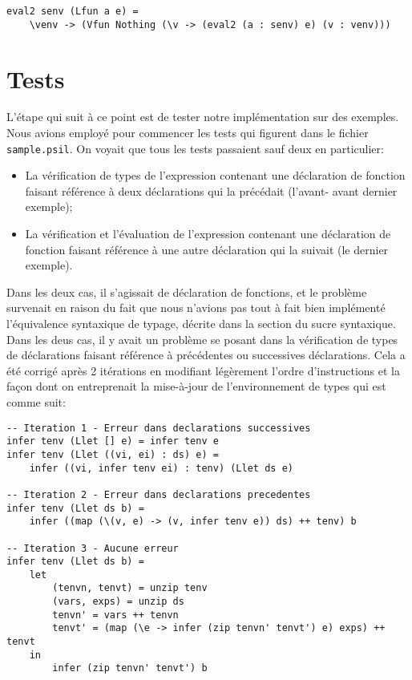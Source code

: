 \documentclass[11pt, titlepage]{article}
\begin{document}
\begin{lstlisting}
eval2 senv (Lfun a e) =
    \venv -> (Vfun Nothing (\v -> (eval2 (a : senv) e) (v : venv)))
\end{lstlisting}

\section{Tests}

L'étape qui suit à ce point est de tester notre implémentation sur des
exemples. Nous avions employé pour commencer les tests qui figurent dans le
fichier \texttt{sample.psil}. On voyait que tous les tests passaient sauf deux
en particulier:
\begin{itemize}
    \item La vérification de types de l'expression contenant une déclaration de
    fonction faisant référence à deux déclarations qui la précédait (l'avant-
    avant dernier exemple);
    \item La vérification et l'évaluation de l'expression contenant une
    déclaration de fonction faisant référence à une autre déclaration qui la
    suivait (le dernier exemple).
\end{itemize}

Dans les deux cas, il s'agissait de déclaration de fonctions, et le problème
survenait en raison du fait que nous n'avions pas tout à fait bien implémenté
l'équivalence syntaxique de typage, décrite dans la section du sucre
syntaxique. \\

Dans les deus cas, il y avait un problème se posant dans la vérification de
types de déclarations faisant référence à précédentes ou successives
déclarations. Cela a été corrigé après 2 itérations en modifiant légèrement
l'ordre d'instructions et la façon dont on entreprenait la mise-à-jour de
l'environnement de types qui est comme suit:

\begin{lstlisting}
-- Iteration 1 - Erreur dans declarations successives
infer tenv (Llet [] e) = infer tenv e
infer tenv (Llet ((vi, ei) : ds) e) =
    infer ((vi, infer tenv ei) : tenv) (Llet ds e)

-- Iteration 2 - Erreur dans declarations precedentes
infer tenv (Llet ds b) =
    infer ((map (\(v, e) -> (v, infer tenv e)) ds) ++ tenv) b

-- Iteration 3 - Aucune erreur
infer tenv (Llet ds b) =
    let
        (tenvn, tenvt) = unzip tenv
        (vars, exps) = unzip ds
        tenvn' = vars ++ tenvn
        tenvt' = (map (\e -> infer (zip tenvn' tenvt') e) exps) ++ tenvt
    in
        infer (zip tenvn' tenvt') b
\end{lstlisting}
\end{document}
